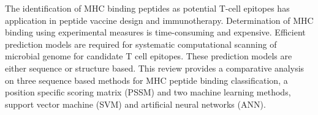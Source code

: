 
The identification of MHC binding peptides as potential T-cell epitopes has application in peptide vaccine design and immunotherapy. 
Determination of MHC binding using experimental measures is time-consuming and expensive. 
Efficient prediction models are required for systematic computational scanning of microbial genome for candidate T cell epitopes. 
These prediction models are either sequence or structure based. 
This review provides a comparative analysis on three sequence based methods for MHC peptide binding classification, 
a position specific scoring matrix (PSSM) and two machine learning methods, support vector machine (SVM) and artificial neural networks (ANN).

